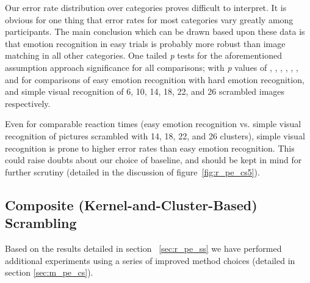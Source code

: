 	    Our error rate distribution over categories proves difficult to interpret.
	    It is obvious for one thing that error rates for most categories vary greatly among participants.
	    The main conclusion which can be drawn based upon these data is that emotion recognition in easy trials is probably more robust than image matching in all other categories.
	    One tailed \textit{p} tests for the aforementioned assumption approach significance for all comparisons; 
	    with \textit{p} values of 
	    ,
	    ,
	    ,
	    ,
	    ,
	    , and
	    for comparisons of easy emotion recognition with hard emotion recognition, and simple visual recognition of \SI{6}{\pixel}, \SI{10}{\pixel}, \SI{14}{\pixel}, \SI{18}{\pixel}, \SI{22}{\pixel}, and \SI{26}{\pixel} scrambled images respectively.
	    
	    Even for comparable reaction times (easy emotion recognition vs. simple visual recognition of pictures scrambled with \SI{14}{\pixel}, \SI{18}{\pixel}, \SI{22}{\pixel}, and \SI{26}{\pixel} clusters), simple visual recognition is prone to higher error rates than easy emotion recognition.
	    This could raise doubts about our choice of baseline, and should be kept in mind for further scrutiny (detailed in the discussion of figure~\ref{fig:r_pe_cs5}).
	\subsection{Composite (Kernel-and-Cluster-Based) Scrambling}\label{sec:r_pe_cs}
	    Based on the results detailed in section ~\ref{sec:r_pe_ss} we have performed additional experiments using a series of improved method choices (detailed in section \ref{sec:m_pe_cs}).
	    
